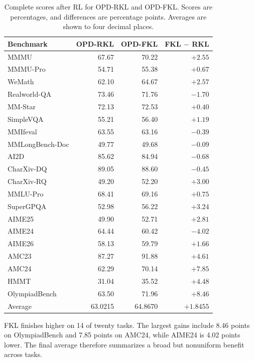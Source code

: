 \documentclass[]{jingdong}
\theoremstyle{plain}
\theoremstyle{definition}
\theoremstyle{remark}
\begin{document}
\begin{table}[H]
\centering
\small
\caption{Complete scores after RL for OPD-RKL and OPD-FKL. Scores are percentages, and differences are percentage points. Averages are shown to four decimal places.}
\label{tab:app-ablation-benchmarks}
\setlength{\tabcolsep}{3pt}
\renewcommand{\arraystretch}{1.08}
\begin{tabular*}{\linewidth}{@{\extracolsep{\fill}}lrrr@{}}
\toprule
Benchmark & OPD-RKL & OPD-FKL & FKL $-$ RKL \\
\midrule
MMMU & 67.67 & 70.22 & $+2.55$ \\
MMMU-Pro & 54.71 & 55.38 & $+0.67$ \\
WeMath & 62.10 & 64.67 & $+2.57$ \\
Realworld-QA & 73.46 & 71.76 & $-1.70$ \\
MM-Star & 72.13 & 72.53 & $+0.40$ \\
SimpleVQA & 55.21 & 56.40 & $+1.19$ \\
MMIfeval & 63.55 & 63.16 & $-0.39$ \\
MMLongBench-Doc & 49.77 & 49.68 & $-0.09$ \\
AI2D & 85.62 & 84.94 & $-0.68$ \\
CharXiv-DQ & 89.05 & 88.60 & $-0.45$ \\
CharXiv-RQ & 49.20 & 52.20 & $+3.00$ \\
MMLU-Pro & 68.41 & 69.16 & $+0.75$ \\
SuperGPQA & 52.98 & 56.22 & $+3.24$ \\
AIME25 & 49.90 & 52.71 & $+2.81$ \\
AIME24 & 64.44 & 60.42 & $-4.02$ \\
AIME26 & 58.13 & 59.79 & $+1.66$ \\
AMC23 & 87.27 & 91.88 & $+4.61$ \\
AMC24 & 62.29 & 70.14 & $+7.85$ \\
HMMT & 31.04 & 35.52 & $+4.48$ \\
OlympiadBench & 63.50 & 71.96 & $+8.46$ \\
\midrule
Average & 63.0215 & 64.8670 & $+1.8455$ \\
\bottomrule
\end{tabular*}
\end{table}


FKL finishes higher on 14 of twenty tasks. The largest gains include 8.46 points on OlympiadBench and 7.85 points on AMC24, while AIME24 is 4.02 points lower. The final average therefore summarizes a broad but nonuniform benefit across tasks.
\end{document}
